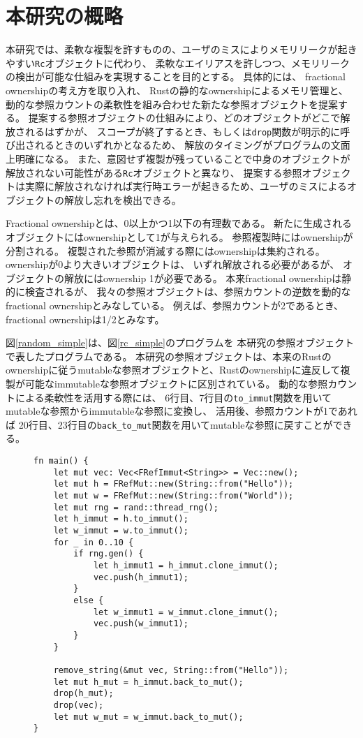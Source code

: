 \documentclass{sumiilab-paper}
\theoremstyle{mystyle}
\numberwithin{definition}{chapter} %
\begin{document}
\section{本研究の概略}
本研究では、柔軟な複製を許すものの、ユーザのミスによりメモリリークが起きやすい\texttt{Rc}オブジェクトに代わり、
柔軟なエイリアスを許しつつ、メモリリークの検出が可能な仕組みを実現することを目的とする。
具体的には、
fractional ownership\cite{DBLP:conf/sas/Boyland03}の考え方を取り入れ、
Rustの静的なownershipによるメモリ管理と、
動的な参照カウントの柔軟性を組み合わせた新たな参照オブジェクトを提案する。
提案する参照オブジェクトの仕組みにより、どのオブジェクトがどこで解放されるはずかが、
スコープが終了するとき、もしくは\texttt{drop}関数が明示的に呼び出されるときのいずれかとなるため、
解放のタイミングがプログラムの文面上明確になる。
また、意図せず複製が残っていることで中身のオブジェクトが解放されない可能性がある\texttt{Rc}オブジェクトと異なり、
提案する参照オブジェクトは実際に解放されなければ実行時エラーが起きるため、ユーザのミスによるオブジェクトの解放し忘れを検出できる。

Fractional ownershipとは、0以上かつ1以下の有理数である。
新たに生成されるオブジェクトにはownershipとして1が与えられる。
参照複製時にはownershipが分割される。
複製された参照が消滅する際にはownershipは集約される。
ownershipが0より大きいオブジェクトは、
いずれ解放される必要があるが、
オブジェクトの解放にはownership 1が必要である。
本来fractional ownership\cite{DBLP:conf/sas/Boyland03}は静的に検査されるが、
我々の参照オブジェクトは、参照カウントの逆数を動的なfractional ownershipとみなしている。
例えば、参照カウントが2であるとき、fractional ownershipは1/2とみなす。

図\ref{random_simple}は、図\ref{rc_simple}のプログラムを
本研究の参照オブジェクトで表したプログラムである。
本研究の参照オブジェクトは、本来のRustのownershipに従うmutableな参照オブジェクトと、Rustのownershipに違反して複製が可能なimmutableな参照オブジェクトに区別されている。
動的な参照カウントによる柔軟性を活用する際には、
6行目、7行目の\texttt{to\_immut}関数を用いてmutableな参照からimmutableな参照に変換し、
活用後、参照カウントが1であれば
20行目、23行目の\texttt{back\_to\_mut}関数を用いてmutableな参照に戻すことができる。
\begin{figure}[htp]
\begin{lstlisting}[caption=本研究の方式を用いた具体例, 
  label=random_simple, captionpos=b]
fn main() {
    let mut vec: Vec<FRefImmut<String>> = Vec::new();
    let mut h = FRefMut::new(String::from("Hello"));
    let mut w = FRefMut::new(String::from("World"));
    let mut rng = rand::thread_rng();
    let h_immut = h.to_immut();
    let w_immut = w.to_immut();
    for _ in 0..10 {
        if rng.gen() {
            let h_immut1 = h_immut.clone_immut();
            vec.push(h_immut1);
        }
        else {
            let w_immut1 = w_immut.clone_immut();
            vec.push(w_immut1);
        }
    }

    remove_string(&mut vec, String::from("Hello"));
    let mut h_mut = h_immut.back_to_mut();
    drop(h_mut);
    drop(vec);
    let mut w_mut = w_immut.back_to_mut();
}
\end{lstlisting}
\end{figure}
\end{document}
